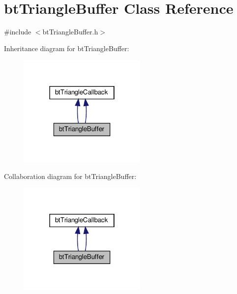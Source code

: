 \hypertarget{classbtTriangleBuffer}{}\section{bt\+Triangle\+Buffer Class Reference}
\label{classbtTriangleBuffer}


{\ttfamily \#include $<$bt\+Triangle\+Buffer.\+h$>$}



Inheritance diagram for bt\+Triangle\+Buffer\+:
\nopagebreak
\begin{figure}[H]
\begin{center}
\leavevmode
\includegraphics[width=178pt]{classbtTriangleBuffer__inherit__graph}
\end{center}
\end{figure}


Collaboration diagram for bt\+Triangle\+Buffer\+:
\nopagebreak
\begin{figure}[H]
\begin{center}
\leavevmode
\includegraphics[width=178pt]{classbtTriangleBuffer__coll__graph}
\end{center}
\end{figure}
